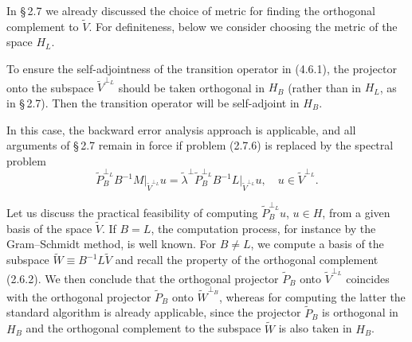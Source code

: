 \documentclass[11pt,oneside]{book}
\begin{document}
In \S\,2.7 we already discussed the choice of metric for finding the orthogonal complement to $\widetilde{V}$. For definiteness, below we consider choosing the metric of the space $H_L$.

To ensure the self-adjointness of the transition operator in (4.6.1), the projector onto the subspace $\widetilde{V}^{\perp_L}$ should be taken orthogonal in $H_B$ (rather than in $H_L$, as in \S\,2.7). Then the transition operator will be self-adjoint in $H_B$.

In this case, the backward error analysis approach is applicable, and all arguments of \S\,2.7 remain in force if problem (2.7.6) is replaced by the spectral problem
\[
\widetilde{P}_B^{\perp_L} B^{-1} M\big|_{\widetilde{V}^{\perp_L}} u = \tilde{\lambda}^{\perp} \widetilde{P}_B^{\perp_L} B^{-1} L\big|_{\widetilde{V}^{\perp_L}} u, \quad u \in \widetilde{V}^{\perp_L}.
\]

Let us discuss the practical feasibility of computing $\widetilde{P}_B^{\perp_L} u$, $u \in H$, from a given basis of the space $\widetilde{V}$. If $B = L$, the computation process, for instance by the Gram--Schmidt method, is well known. For $B \neq L$, we compute a basis of the subspace $\widetilde{W} \equiv B^{-1} L \widetilde{V}$ and recall the property of the orthogonal complement (2.6.2). We then conclude that the orthogonal projector $\widetilde{P}_B$ onto $\widetilde{V}^{\perp_L}$ coincides with the orthogonal projector $\widetilde{P}_B$ onto $\widetilde{W}^{\perp_B}$, whereas for computing the latter the standard algorithm is already applicable, since the projector $\widetilde{P}_B$ is orthogonal in $H_B$ and the orthogonal complement to the subspace $\widetilde{W}$ is also taken in $H_B$.

\nocite{*}


\end{document}
